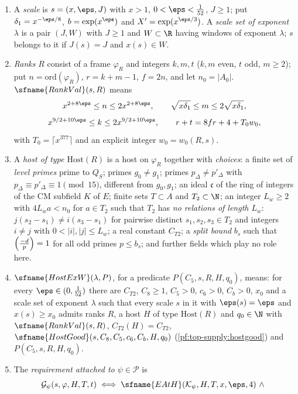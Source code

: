 \begin{definition}\label{pf:top-supply:hostexw}
\begin{enumerate}[label=(\roman*)]
\item A \emph{scale} is $s=(x,\eps,J)$ with $x>1$, $0<\eps<\frac1{52}$, $J\ge1$; put $\delta_1=x^{-\eps/8}$,
$b=\exp(x^\eps)$ and $X'=\exp(x^{\eps/3})$. A \emph{scale set of exponent $\lambda$} is a pair $(J,W)$ with $J\ge1$
and $W\subset\R$ having windows of exponent $\lambda$; $s$ belongs to it if $J(s)=J$ and $x(s)\in W$.
\item \emph{Ranks} $R$ consist of a frame $\varphi_R$ and integers $k,m,t$ ($k,m$ even, $t$ odd, $m\ge2$); put
$n=\mathrm{ord}(\varphi_R)$, $r=k+m-1$, $f=2n$, and let $n_0=|A_0|$. $\sfname{RankVal}(s,R)$ means
\[
x^{2+8\eps}\le n\le2x^{2+8\eps},\qquad\sqrt{x\delta_1}\le m\le2\sqrt{x\delta_1},
\]
\[
x^{9/2+10\eps}\le k\le2x^{9/2+10\eps},\qquad r+t=8fr+4+T_0w_0,
\]
with $T_0=\lceil x^{377}\rceil$ and an explicit integer $w_0=w_0(R,s)$.
\item A \emph{host of type $\mathrm{Host}(R)$} is a host on $\varphi_R$ together with \emph{choices}: a finite set of
\emph{level primes} prime to $Q_S$; primes $g_0\ne g_1$; primes $p_\Delta\ne p'_\Delta$ with
$p_\Delta\equiv p'_\Delta\equiv1\pmod{15}$, different from $g_0,g_1$; an ideal $\mathfrak c$ of the ring of integers of
the CM subfield $K$ of $E$; finite sets $T\subset A$ and $T_2\subset\N$; an integer $L_w\ge2$ with $4L_wa<n_0$ for
$a\in T_2$ such that $T_2$ has \emph{no relations of length $L_w$}: $j(s_2-s_1)\ne i(s_3-s_1)$ for pairwise distinct
$s_1,s_2,s_3\in T_2$ and integers $i\ne j$ with $0<|i|,|j|\le L_w$; a real constant $C_{T2}$; a \emph{split bound}
$b_s$ such that $\left(\frac{-d}{p}\right)=1$ for all odd primes $p\le b_s$; and further fields which play no role here.
\item $\sfname{HostExW}(\lambda,P)$, for a predicate $P(C_5,s,R,H,q_0)$, means: for every $\eps\in(0,\frac1{52})$
there are $C_{T2}$, $C_8\ge1$, $C_5>0$, $c_6>0$, $C_b>0$, $x_0$ and a scale set of exponent $\lambda$ such that every
scale $s$ in it with $\eps(s)=\eps$ and $x(s)\ge x_0$ admits ranks $R$, a host $H$ of type $\mathrm{Host}(R)$ and
$q_0\in\N$ with $\sfname{RankVal}(s,R)$, $C_{T2}(H)=C_{T2}$, $\sfname{HostGood}(s,C_8,C_5,c_6,C_b,H,q_0)$
(\cref{pf:top-supply:hostgood}) and $P(C_5,s,R,H,q_0)$.
\item The \emph{requirement attached to $\psi\in\mathcal P$} is
\[
\mathcal G_\psi(s,\varphi,H,T,t)\iff\sfname{EAtH}(\mathcal K_\psi,H,T,x,\eps,4)\ \wedge\
\]
\end{enumerate}
\end{definition}
